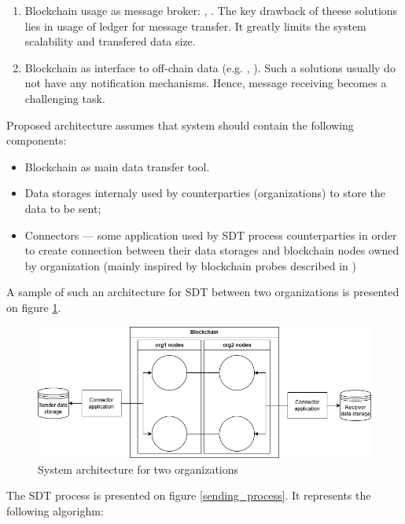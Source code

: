 \documentclass[10pt]{llncs}
\begin{document}
\begin{enumerate}
    \item Blockchain usage as message broker: \cite{kim2020hybrid}, \cite{Ghaemi2021}. 
    The key drawback of theese solutions lies in usage of ledger for message transfer.
    It greatly limits the system scalability and transfered data size. 
    \item Blockchain as interface to off-chain data (e.g. \cite{Wang2024}, \cite{Jia2023}).
    Such a solutions usually do not have any notification mechanisms.
    Hence, message receiving becomes a challenging task.
\end{enumerate}

Proposed architecture assumes that system should contain the following components:

\begin{itemize}
    \item Blockchain as main data transfer tool. 
    \item Data storages internaly used by counterparties (organizations) to store the data to be sent;
    \item Connectors --- some application used by SDT process counterparties in order to create connection between their data storages
    and blockchain nodes owned by organization (mainly inspired by blockchain probes described in \cite{Jia2023})
\end{itemize}

A sample of such an architecture for SDT between two organizations is presented on figure \ref{system_architecture}.

\begin{figure}
    \includegraphics[width=\textwidth]{system_architecture.png}
    \caption{System architecture for two organizations} \label{system_architecture}
\end{figure}

The SDT process is presented on figure \ref{sending_process}.
It represents the following algorighm:
\end{document}
